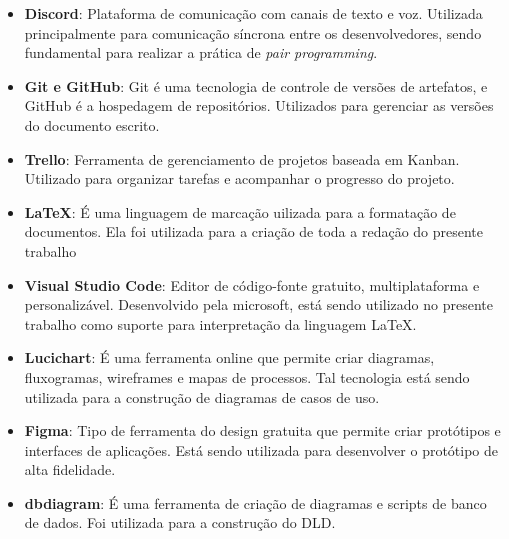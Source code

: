 \begin{itemize}
    \item \textbf{Discord}: Plataforma de comunicação com canais de texto e voz. Utilizada principalmente para comunicação síncrona entre os desenvolvedores, sendo fundamental para realizar a prática de \textit{pair programming}.
    \item \textbf{Git e GitHub}: Git é uma tecnologia de controle de versões de artefatos, e GitHub é a hospedagem de repositórios. Utilizados para gerenciar as versões do documento escrito.
    \item \textbf{Trello}: Ferramenta de gerenciamento de projetos baseada em Kanban. Utilizado para organizar tarefas e acompanhar o progresso do projeto.
    \item \textbf{LaTeX}: É uma linguagem de marcação uilizada para a formatação de documentos. Ela foi utilizada para a criação de toda a redação do presente trabalho
    \item \textbf{Visual Studio Code}: Editor de código-fonte gratuito, multiplataforma e personalizável. Desenvolvido pela microsoft, está sendo utilizado no presente trabalho como suporte para interpretação da linguagem LaTeX.
    \item \textbf{Lucichart}: É uma ferramenta online que permite criar diagramas, fluxogramas, wireframes e mapas de processos. Tal tecnologia está sendo utilizada para a construção de diagramas de casos de uso.
    \item \textbf{Figma}: Tipo de ferramenta do design gratuita que permite criar protótipos e interfaces de aplicações. Está sendo utilizada para desenvolver o protótipo de alta fidelidade.
    \item \textbf{dbdiagram}: É uma ferramenta de criação de diagramas e scripts de banco de dados. Foi utilizada para a construção do DLD.
\end{itemize}